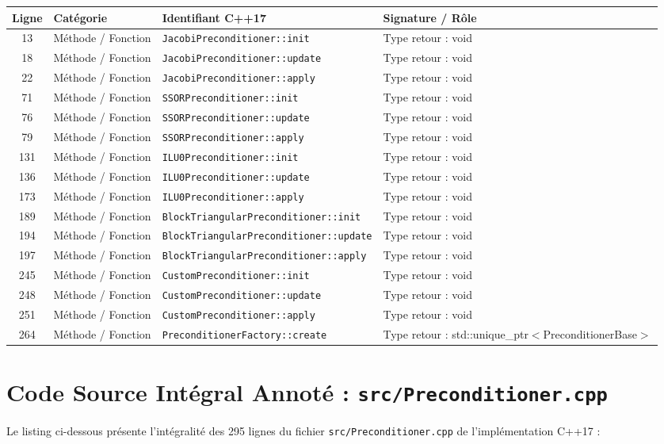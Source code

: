 \documentclass[10pt,a4paper,oneside]{book}
\begin{document}
\begin{center}\small
\begin{tabular}{clll}
\toprule
\textbf{Ligne} & \textbf{Catégorie} & \textbf{Identifiant C++17} & \textbf{Signature / Rôle} \\
\midrule
13 & Méthode / Fonction & \texttt{JacobiPreconditioner::init} & Type retour : void \\
18 & Méthode / Fonction & \texttt{JacobiPreconditioner::update} & Type retour : void \\
22 & Méthode / Fonction & \texttt{JacobiPreconditioner::apply} & Type retour : void \\
71 & Méthode / Fonction & \texttt{SSORPreconditioner::init} & Type retour : void \\
76 & Méthode / Fonction & \texttt{SSORPreconditioner::update} & Type retour : void \\
79 & Méthode / Fonction & \texttt{SSORPreconditioner::apply} & Type retour : void \\
131 & Méthode / Fonction & \texttt{ILU0Preconditioner::init} & Type retour : void \\
136 & Méthode / Fonction & \texttt{ILU0Preconditioner::update} & Type retour : void \\
173 & Méthode / Fonction & \texttt{ILU0Preconditioner::apply} & Type retour : void \\
189 & Méthode / Fonction & \texttt{BlockTriangularPreconditioner::init} & Type retour : void \\
194 & Méthode / Fonction & \texttt{BlockTriangularPreconditioner::update} & Type retour : void \\
197 & Méthode / Fonction & \texttt{BlockTriangularPreconditioner::apply} & Type retour : void \\
245 & Méthode / Fonction & \texttt{CustomPreconditioner::init} & Type retour : void \\
248 & Méthode / Fonction & \texttt{CustomPreconditioner::update} & Type retour : void \\
251 & Méthode / Fonction & \texttt{CustomPreconditioner::apply} & Type retour : void \\
264 & Méthode / Fonction & \texttt{PreconditionerFactory::create} & Type retour : std::unique\_ptr$<$PreconditionerBase$>$ \\
\bottomrule
\end{tabular}
\end{center}

\section{Code Source Intégral Annoté : \texttt{src/Preconditioner.cpp}}
Le listing ci-dessous présente l'intégralité des 295 lignes du fichier \texttt{src/Preconditioner.cpp} de l'implémentation C++17 :
\end{document}
